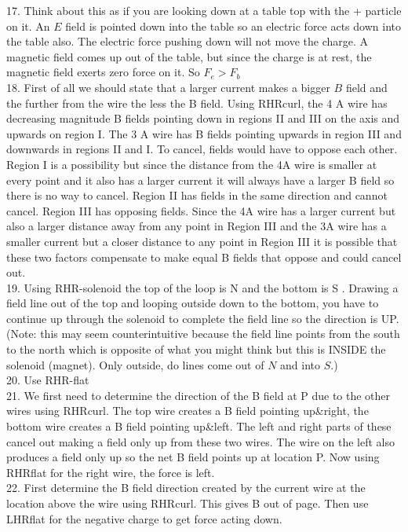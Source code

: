 \begin{enumerate}
17. Think about this as if you are looking down at a table top with the + particle on it. An $E$ field is pointed down into the table so an electric force acts down into the table also. The electric force pushing down will not move the charge. A magnetic field comes up out of the table, but since the charge is at rest, the magnetic field exerts zero force on it. So $F_{e}>F_{b}$\\
18. First of all we should state that a larger current makes a bigger $B$ field and the further from the wire the less the B field. Using RHRcurl, the 4 A wire has decreasing magnitude B fields pointing down in regions II and III on the axis and upwards on region I. The 3 A wire has B fields pointing upwards in region III and downwards in regions II and I. To cancel, fields would have to oppose each other. Region I is a possibility but since the distance from the 4A wire is smaller at every point and it also has a larger current it will always have a larger B field so there is no way to cancel. Region II has fields in the same direction and cannot cancel. Region III has opposing fields. Since the 4A wire has a larger current but also a larger distance away from any point in Region III and the 3A wire has a smaller current but a closer distance to any point in Region III it is possible that these two factors compensate to make equal B fields that oppose and could cancel out.\\
19. Using RHR-solenoid the top of the loop is N and the bottom is S . Drawing a field line out of the top and looping outside down to the bottom, you have to continue up through the solenoid to complete the field line so the direction is UP. (Note: this may seem counterintuitive because the field line points from the south to the north which is opposite of what you might think but this is INSIDE the solenoid (magnet). Only outside, do lines come out of $N$ and into $S$.)\\
20. Use RHR-flat\\
21. We first need to determine the direction of the B field at P due to the other wires using RHRcurl. The top wire creates a B field pointing up\&right, the bottom wire creates a B field pointing up\&left. The left and right parts of these cancel out making a field only up from these two wires. The wire on the left also produces a field only up so the net B field points up at location P. Now using RHRflat for the right wire, the force is left.\\
22. First determine the B field direction created by the current wire at the location above the wire using RHRcurl. This gives B out of page. Then use LHRflat for the negative charge to get force acting down.\\

\end{enumerate}
